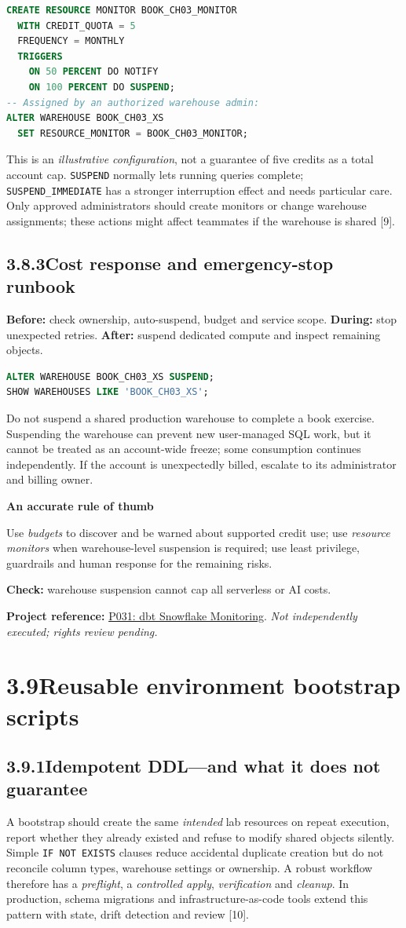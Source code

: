 \documentclass[11pt,twoside]{article}
\newcommand{\topic}[2]{\subsection*{#1\quad #2}}
\newcommand{\repo}[2]{\par\begingroup\fontsize{8.0}{9.6}\selectfont\sffamily\color{inkgray}\textbf{Project reference:} \href{#2}{#1}. \textit{Not independently executed; rights review pending.}\par\endgroup}
\begin{document}
\begin{lstlisting}[language=SQL,caption={OPTIONAL admin-only Resource Monitor configuration; not executed.}]
CREATE RESOURCE MONITOR BOOK_CH03_MONITOR
  WITH CREDIT_QUOTA = 5
  FREQUENCY = MONTHLY
  TRIGGERS
    ON 50 PERCENT DO NOTIFY
    ON 100 PERCENT DO SUSPEND;
-- Assigned by an authorized warehouse admin:
ALTER WAREHOUSE BOOK_CH03_XS
  SET RESOURCE_MONITOR = BOOK_CH03_MONITOR;
\end{lstlisting}
This is an \emph{illustrative configuration}, not a guarantee of five credits as a total account cap. \texttt{SUSPEND} normally lets running queries complete; \texttt{SUSPEND\_IMMEDIATE} has a stronger interruption effect and needs particular care. Only approved administrators should create monitors or change warehouse assignments; these actions might affect teammates if the warehouse is shared [9].

\topic{3.8.3}{Cost response and emergency-stop runbook}
\textbf{Before:} check ownership, auto-suspend, budget and service scope. \textbf{During:} stop unexpected retries. \textbf{After:} suspend dedicated compute and inspect remaining objects.

\begin{lstlisting}[language=SQL,caption={Approved stop action; only use against a dedicated lab warehouse.}]
ALTER WAREHOUSE BOOK_CH03_XS SUSPEND;
SHOW WAREHOUSES LIKE 'BOOK_CH03_XS';
\end{lstlisting}
Do not suspend a shared production warehouse to complete a book exercise. Suspending the warehouse can prevent new user-managed SQL work, but it cannot be treated as an account-wide freeze; some consumption continues independently. If the account is unexpectedly billed, escalate to its administrator and billing owner.

\begin{insight}
\textbf{An accurate rule of thumb}\par
Use \emph{budgets} to discover and be warned about supported credit use; use \emph{resource monitors} when warehouse-level suspension is required; use least privilege, guardrails and human response for the remaining risks.
\end{insight}
\textbf{Check:} warehouse suspension cannot cap all serverless or AI costs.
\repo{P031: dbt Snowflake Monitoring}{https://github.com/get-select/dbt-snowflake-monitoring}

\newpage
\section*{3.9\quad Reusable environment bootstrap scripts}
\topic{3.9.1}{Idempotent DDL---and what it does not guarantee}
A bootstrap should create the same \emph{intended} lab resources on repeat execution, report whether they already existed and refuse to modify shared objects silently. Simple \texttt{IF NOT EXISTS} clauses reduce accidental duplicate creation but do not reconcile column types, warehouse settings or ownership. A robust workflow therefore has a \emph{preflight}, a \emph{controlled apply}, \emph{verification} and \emph{cleanup}. In production, schema migrations and infrastructure-as-code tools extend this pattern with state, drift detection and review [10].
\end{document}
